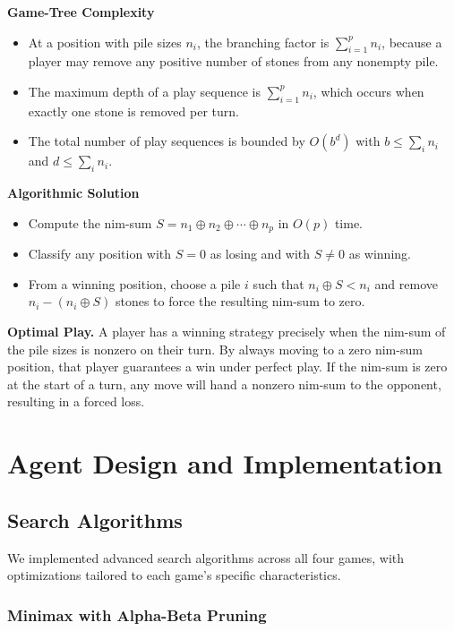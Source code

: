 \documentclass[12pt]{article}
\begin{document}
\noindent\textbf{Game-Tree Complexity}
\begin{itemize}
  \item At a position with pile sizes $n_i$, the branching factor is $\sum_{i=1}^p n_i$, because a player may remove any positive number of stones from any nonempty pile.
  \item The maximum depth of a play sequence is $\sum_{i=1}^p n_i$, which occurs when exactly one stone is removed per turn.
  \item The total number of play sequences is bounded by $O(b^d)$ with $b\le \sum_i n_i$ and $d\le \sum_i n_i$.
\end{itemize}

\noindent\textbf{Algorithmic Solution}
\begin{itemize}
  \item Compute the nim-sum $S = n_1 \oplus n_2 \oplus \cdots \oplus n_p$ in $O(p)$ time.
  \item Classify any position with $S=0$ as losing and with $S\neq 0$ as winning.
  \item From a winning position, choose a pile $i$ such that $n_i \oplus S < n_i$ and remove $n_i - (n_i \oplus S)$ stones to force the resulting nim-sum to zero.
\end{itemize}

\noindent\textbf{Optimal Play.}  
A player has a winning strategy precisely when the nim-sum of the pile sizes is nonzero on their turn. By always moving to a zero nim-sum position, that player guarantees a win under perfect play. If the nim-sum is zero at the start of a turn, any move will hand a nonzero nim-sum to the opponent, resulting in a forced loss.

\section{Agent Design and Implementation}

\subsection{Search Algorithms}

We implemented advanced search algorithms across all four games, with optimizations tailored to each game's specific characteristics.

\subsubsection{Minimax with Alpha-Beta Pruning}
\end{document}
